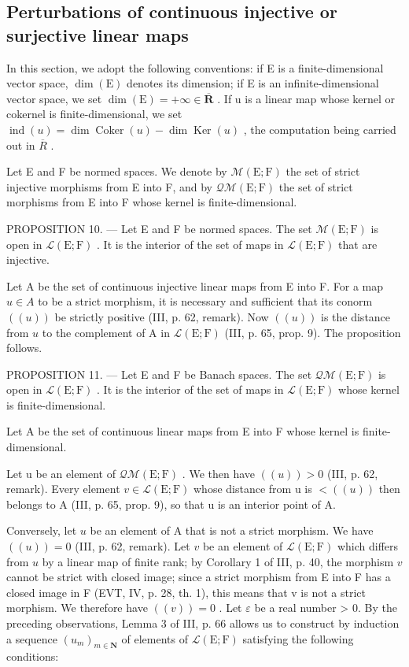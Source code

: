 \subsection{Perturbations of continuous injective or surjective linear maps}

In this section, we adopt the following conventions: if E is a finite-dimensional vector space, \(\dim(\mathrm{E})\) denotes its dimension; if E is an infinite-dimensional vector space, we set \(\dim(\mathrm{E}) = +\infty \in \overline{\mathbf{R}}\) . If u is a linear map whose kernel or cokernel is finite-dimensional, we set \(\operatorname{ind}(u) = \dim \operatorname{Coker}(u) - \dim \operatorname{Ker}(u)\) , the computation being carried out in \(\overline{R}\) .

Let E and F be normed spaces. We denote by \(\mathcal{M}(\mathrm{E};\mathrm{F})\) the set of strict injective morphisms from E into F, and by \(\mathcal{Q}\mathcal{M}(\mathrm{E};\mathrm{F})\) the set of strict morphisms from E into F whose kernel is finite-dimensional.

PROPOSITION 10. --- Let E and F be normed spaces. The set \(\mathcal{M}(\mathrm{E};\mathrm{F})\) is open in \(\mathcal{L}(\mathrm{E};\mathrm{F})\) . It is the interior of the set of maps in \(\mathcal{L}(\mathrm{E};\mathrm{F})\) that are injective.

Let A be the set of continuous injective linear maps from E into F. For a map \(u \in A\) to be a strict morphism, it is necessary and sufficient that its conorm \(((u))\) be strictly positive (III, p. 62, remark). Now \(((u))\) is the distance from \(u\) to the complement of A in \(\mathcal{L}(\mathrm{E};\mathrm{F})\) (III, p. 65, prop. 9). The proposition follows.

PROPOSITION 11. --- Let E and F be Banach spaces. The set \(\mathcal{Q}\mathcal{M}(\mathrm{E};\mathrm{F})\) is open in \(\mathcal{L}(\mathrm{E};\mathrm{F})\) . It is the interior of the set of maps in \(\mathcal{L}(\mathrm{E};\mathrm{F})\) whose kernel is finite-dimensional.

Let A be the set of continuous linear maps from E into F whose kernel is finite-dimensional.

Let u be an element of \(\mathcal{Q}\mathcal{M}(\mathrm{E};\mathrm{F})\) . We then have \(((u)) > 0\) (III, p. 62, remark). Every element \(v \in \mathcal{L}(\mathrm{E};\mathrm{F})\) whose distance from u is \(<((u))\) then belongs to A (III, p. 65, prop. 9), so that u is an interior point of A.

Conversely, let \(u\) be an element of A that is not a strict morphism. We have \(((u)) = 0\) (III, p. 62, remark). Let \(v\) be an element of \(\mathcal{L}(\mathrm{E};\mathrm{F})\) which differs from \(u\) by a linear map of finite rank; by Corollary 1 of III, p. 40, the morphism \(v\) cannot be strict with closed image; since a strict morphism from E into F has a closed image in F (EVT, IV, p. 28, th. 1), this means that v is not a strict morphism. We therefore have \(((v)) = 0\) . Let \(\varepsilon\) be a real number \textgreater{} 0. By the preceding observations, Lemma 3 of III, p. 66 allows us to construct by induction a sequence \((u_{m})_{m \in \mathbf{N}}\) of elements of \(\mathcal{L}(\mathrm{E}; \mathrm{F})\) satisfying the following conditions:

